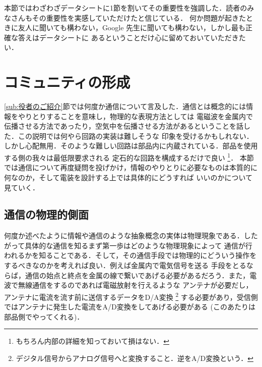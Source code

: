 \documentclass[dvipdfmx]{jsbook}
\begin{document}
  本節ではわざわざデータシートに1節を割いてその重要性を強調した．読者のみなさんもその重要性を実感していただけたと信じている．
  何か問題が起きたときに友人に聞いても構わない，Google 先生に聞いても構わない，しかし最も正確な答えはデータシートに
  あるということだけ心に留めておいていただきたい．


\section{コミュニティの形成}
\label{sub:コミュニティの形成}

  \ref{sub:役者のご紹介}節では何度か通信について言及した．通信とは概念的には情報をやりとりすることを意味し，物理的な表現方法としては
  電磁波を金属内で伝播させる方法であったり，空気中を伝播させる方法があるということを話した．この説明では何やら回路の実装は難しそうな
  印象を受けるかもしれない．しかし心配無用．そのような難しい回路は部品内に内蔵されている．部品を使用する側の我々は最低限要求される
  定石的な回路を構成するだけで良い
  \footnote{もちろん内部の詳細を知っておいて損はない．}．
  本節では通信について再度疑問を投げかけ，情報のやりとりに必要なものは本質的に何なのか，そして電装を設計する上では具体的にどうすれば
  いいのかについて見ていく．

\subsection{通信の物理的側面}

  何度か述べたように情報や通信のような抽象概念の実体は物理現象である．したがって具体的な通信を知るまず第一歩はどのような物理現象によって
  通信が行われるかを知ることである．そして，その通信手段では物理的にどういう操作をするべきなのかを考えれば良い．例えば金属内で電気信号を送る
  手段をとるならば，通信の始点と終点を金属の線で繋いであげる必要があるだろう．また，電波で無線通信をするのであれば電磁放射を行えるような
  アンテナが必要だし，アンテナに電流を流す前に送信するデータをD/A変換
  \footnote{デジタル信号からアナログ信号へと変換すること．逆をA/D変換という．}
  する必要があり，受信側ではアンテナに発生した電流をA/D変換をしてあげる必要がある (このあたりは部品側でやってくれる)．
\end{document}
